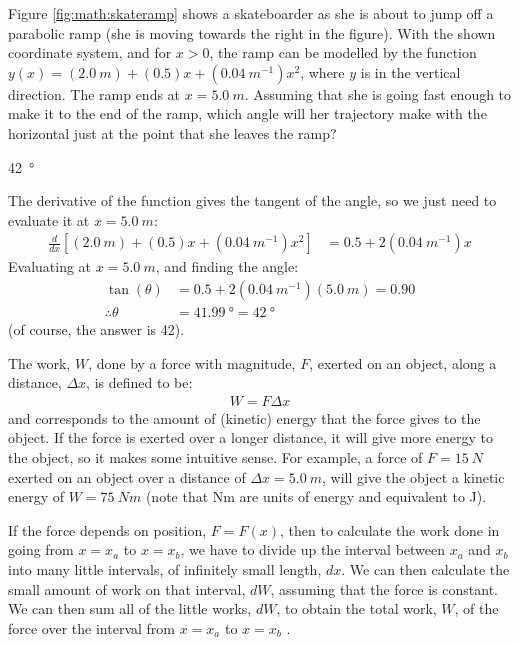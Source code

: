 \question Figure \ref{fig:math:skateramp} shows a skateboarder as she is about to jump off a parabolic ramp (she is moving towards the right in the figure). With the shown coordinate system, and for $x>0$, the ramp can be modelled by the function $y(x) = (\SI{2.0}{m})+(0.5)x+(\SI{0.04}{m^{-1}})x^2$, where $y$ is in the vertical direction. The ramp ends at $x=\SI{5.0}{m}$. Assuming that she is going fast enough to make it to the end of the ramp, which angle will her trajectory make with the horizontal just at the point that she leaves the ramp?
\begin{finalanswer}
\SI{42}{\degree}
\end{finalanswer}
\begin{solution}
The derivative of the function gives the tangent of the angle, so we just need to evaluate it at $x=\SI{5.0}{m}$:
\begin{align*}
\frac{d}{dx}[(\SI{2.0}{m})+(0.5)x+(\SI{0.04}{m^{-1}})x^2] &= 0.5+2(\SI{0.04}{m^{-1}})x
\end{align*}
Evaluating at $x=\SI{5.0}{m}$, and finding the angle:
\begin{align*}
\tan(\theta)&= 0.5+2(\SI{0.04}{m^{-1}})(\SI{5.0}{m})=0.90\\
\therefore \theta &= \SI{41.99}{\degree}=\SI{42}{\degree}
\end{align*}
(of course, the answer is 42).
\end{solution}

\question The work, $W$, done by a force with magnitude, $F$, exerted on an object, along a distance, $\Delta x$, is defined to be:
\begin{align*}
W = F\Delta x
\end{align*}
and corresponds to the amount of (kinetic) energy that the force gives to the object. If the force is exerted over a longer distance, it will give more energy to the object, so it makes some intuitive sense. For example, a force of $F=\SI{15}{N}$ exerted on an object over a distance of $\Delta x=\SI{5.0}{m}$, will give the object a kinetic energy of $W=\SI{75}{Nm}$ (note that \si{Nm} are units of energy and equivalent to \si{J}).

If the force depends on position, $F=F(x)$, then to calculate the work done in going from $x=x_a$ to $x=x_b$, we have to divide up the interval between $x_a$ and $x_b$ into many little intervals, of infinitely small length, $dx$. We can then calculate the small amount of work on that interval, $dW$, assuming that the force is constant. We can then sum all of the little works, $dW$, to obtain the total work, $W$, of the force over the interval from  $x=x_a$ to $x=x_b$ .

